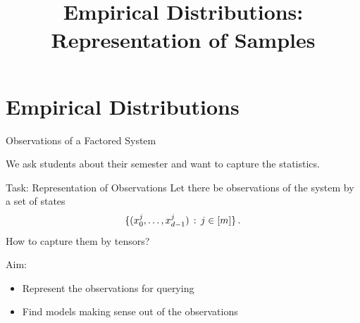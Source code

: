 \documentclass{beamer}
\title[Empirical Distributions]{
    \coursechaptertwo \\
    {\huge Empirical Distributions: Representation of Samples}
}
\begin{document}
    {\frame[plain]{\titlepage}}


%
%
%
%
%
%
%
%
%
%
%
%


    \section{Empirical Distributions}


    \begin{frame}{Observations of a Factored System}

        \begin{example}
	We ask students about their semester and want to capture the statistics.
        \end{example}

        \begin{block}{Task: Representation of Observations}
            Let there be observations of the system by a set of states
            \[ \{({x_{0}^{j},\ldots,x_{d-1}^{j}}) \, : \, j\in[m] \} \, . \]
            How to capture them by tensors?
        \end{block}

        Aim:
        \begin{itemize}
            \item Represent the observations for querying
            \item Find models making sense out of the observations
        \end{itemize}

    \end{frame}
\end{document}
